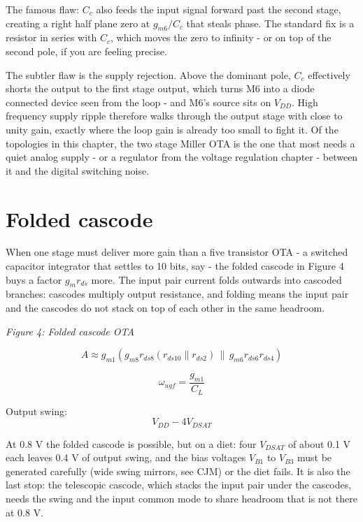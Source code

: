The famous flaw: \(C_c\) also feeds the input signal forward past the
second stage, creating a right half plane zero at \(g_{m6}/C_c\) that
steals phase. The standard fix is a resistor in series with \(C_c\),
which moves the zero to infinity - or on top of the second pole, if you
are feeling precise.

The subtler flaw is the supply rejection. Above the dominant pole,
\(C_c\) effectively shorts the output to the first stage output, which
turns M6 into a diode connected device seen from the loop - and M6's
source sits on \(V_{DD}\). High frequency supply ripple therefore walks
through the output stage with close to unity gain, exactly where the
loop gain is already too small to fight it. Of the topologies in this
chapter, the two stage Miller OTA is the one that most needs a quiet
analog supply - or a regulator from the voltage regulation chapter -
between it and the digital switching noise.

\section{Folded cascode}\label{folded-cascode}

When one stage must deliver more gain than a five transistor OTA - a
switched capacitor integrator that settles to 10 bits, say - the folded
cascode in Figure 4 buys a factor \(g_m r_{ds}\) more. The input pair
current folds outwards into cascoded branches: cascodes multiply output
resistance, and folding means the input pair and the cascodes do not
stack on top of each other in the same headroom.


{
\centering
{}
}

\emph{Figure 4: Folded cascode OTA}

\[ A \approx g_{m1} \left( g_{m8} r_{ds8} (r_{ds10} \parallel r_{ds2}) \, \parallel \, g_{m6} r_{ds6} r_{ds4} \right) \]

\[ \omega_{ugf} = \frac{g_{m1}}{C_L} \]

Output swing: \[ V_{DD} - 4 V_{DSAT} \]

At 0.8 V the folded cascode is possible, but on a diet: four
\(V_{DSAT}\) of about 0.1 V each leaves 0.4 V of output swing, and the
bias voltages \(V_{B1}\) to \(V_{B3}\) must be generated carefully (wide
swing mirrors, see CJM) or the diet fails. It is also the last stop: the
telescopic cascode, which stacks the input pair under the cascodes,
needs the swing and the input common mode to share headroom that is not
there at 0.8 V.

